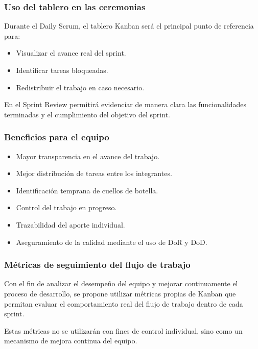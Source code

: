 \documentclass[12pt]{article}
\begin{document}
\subsubsection{Uso del tablero en las ceremonias}

Durante el Daily Scrum, el tablero Kanban será el principal punto de referencia para:

\begin{itemize}
    \item Visualizar el avance real del sprint.
    \item Identificar tareas bloqueadas.
    \item Redistribuir el trabajo en caso necesario.
\end{itemize}

En el Sprint Review permitirá evidenciar de manera clara las funcionalidades terminadas y el cumplimiento del objetivo del sprint.

\subsubsection{Beneficios para el equipo}

\begin{itemize}
    \item Mayor transparencia en el avance del trabajo.
    \item Mejor distribución de tareas entre los integrantes.
    \item Identificación temprana de cuellos de botella.
    \item Control del trabajo en progreso.
    \item Trazabilidad del aporte individual.
    \item Aseguramiento de la calidad mediante el uso de DoR y DoD.
\end{itemize}

\subsubsection{Métricas de seguimiento del flujo de trabajo}

Con el fin de analizar el desempeño del equipo y mejorar continuamente el proceso de desarrollo, se propone utilizar métricas propias de Kanban que permitan evaluar el comportamiento real del flujo de trabajo dentro de cada sprint.

Estas métricas no se utilizarán con fines de control individual, sino como un mecanismo de mejora continua del equipo.
\end{document}
